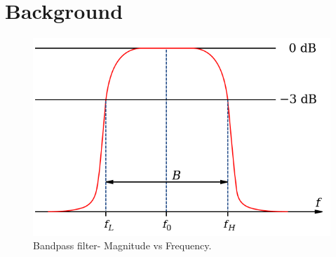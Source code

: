 \documentclass[sigconf, authorversion=false,  screen=true]{acmart}
\begin{document}
\section{Background}

	\begin{figure}
	\includegraphics[width=\linewidth]{band_pass}
	\caption{Bandpass filter- Magnitude vs Frequency.~\cite{wiki:bandpass}}
	\label{fig:band_pass}
	\end{figure}
\end{document}

